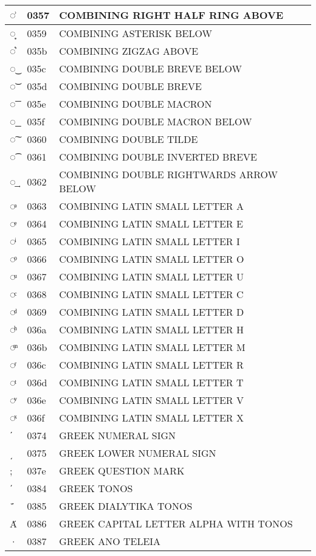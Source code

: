 \documentclass[12pt,letterpaper,openany]{book}
\begin{document}
\begin{center}
\begin{supertabular}{|m{0.25in}|m{0.5in}|m{4in}|}
◌͗ & 0357 & COMBINING RIGHT HALF RING ABOVE\\\hline
◌͙ & 0359 & COMBINING ASTERISK BELOW\\\hline
◌͛ & 035b & COMBINING ZIGZAG ABOVE\\\hline
◌͜ & 035c & COMBINING DOUBLE BREVE BELOW\\\hline
◌͝ & 035d & COMBINING DOUBLE BREVE\\\hline
◌͞ & 035e & COMBINING DOUBLE MACRON\\\hline
◌͟ & 035f & COMBINING DOUBLE MACRON BELOW\\\hline
◌͠ & 0360 & COMBINING DOUBLE TILDE\\\hline
◌͡ & 0361 & COMBINING DOUBLE INVERTED BREVE\\\hline
◌͢ & 0362 & COMBINING DOUBLE RIGHTWARDS ARROW BELOW\\\hline
◌ͣ & 0363 & COMBINING LATIN SMALL LETTER A\\\hline
◌ͤ & 0364 & COMBINING LATIN SMALL LETTER E\\\hline
◌ͥ & 0365 & COMBINING LATIN SMALL LETTER I\\\hline
◌ͦ & 0366 & COMBINING LATIN SMALL LETTER O\\\hline
◌ͧ & 0367 & COMBINING LATIN SMALL LETTER U\\\hline
◌ͨ & 0368 & COMBINING LATIN SMALL LETTER C\\\hline
◌ͩ & 0369 & COMBINING LATIN SMALL LETTER D\\\hline
◌ͪ & 036a & COMBINING LATIN SMALL LETTER H\\\hline
◌ͫ & 036b & COMBINING LATIN SMALL LETTER M\\\hline
◌ͬ & 036c & COMBINING LATIN SMALL LETTER R\\\hline
◌ͭ & 036d & COMBINING LATIN SMALL LETTER T\\\hline
◌ͮ & 036e & COMBINING LATIN SMALL LETTER V\\\hline
◌ͯ & 036f & COMBINING LATIN SMALL LETTER X\\\hline
ʹ & 0374 & GREEK NUMERAL SIGN\\\hline
͵ & 0375 & GREEK LOWER NUMERAL SIGN\\\hline
; & 037e & GREEK QUESTION MARK\\\hline
΄ & 0384 & GREEK TONOS\\\hline
΅ & 0385 & GREEK DIALYTIKA TONOS\\\hline
Ά & 0386 & GREEK CAPITAL LETTER ALPHA WITH TONOS\\\hline
· & 0387 & GREEK ANO TELEIA\\\hline

\end{supertabular}
\end{center}
\end{document}
